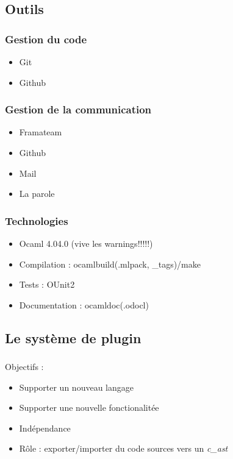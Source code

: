 \documentclass{beamer}
\begin{document}
\begin{frame}
    \section{Outils}
    \frametitle{Gestion du code}

    \begin{itemize}
        \item Git
        \item Github    
    \end{itemize}   
\end{frame}    

\begin{frame}
    \frametitle{Gestion de la communication}

    \begin{itemize}
        \item Framateam
        \item Github
        \item Mail
        \item La parole
    \end{itemize}        
\end{frame}

\begin{frame}
    \frametitle{Technologies}

    \begin{itemize}
        \item Ocaml 4.04.0 (vive les warnings!!!!!)
        \item Compilation : ocamlbuild(.mlpack, \_tags)/make
        \item Tests : OUnit2 
        \item Documentation : ocamldoc(.odocl)     
    \end{itemize}        
\end{frame}    

\begin{frame}
\section{Le système de plugin}
\frametitle{}
 
 Objectifs :
\begin{itemize}
    \item Supporter un nouveau langage
    \item Supporter une nouvelle fonctionalitée 
    \item Indépendance %
    \item Rôle : exporter/importer du code sources vers un \textit{c\_ast}
\end{itemize}

\end{frame}
\end{document}
